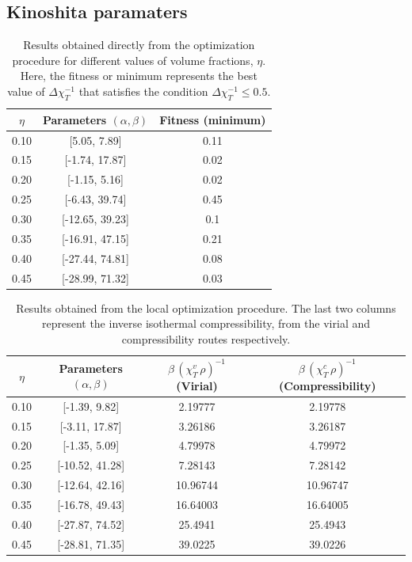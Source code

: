 \subsection{Kinoshita paramaters}
\begin{table}
    \centering
    \begin{tabular}{|c|c|c|}
    \hline
    \(\eta\)  & Parameters \(\left(\alpha, \beta\right)\)  & Fitness (minimum)    \\ \hline
    0.10 & {[}5.05, 7.89{]}    & 0.11          \\ \hline
    0.15 & {[}-1.74, 17.87{]}   & 0.02          \\ \hline
    0.20 & {[}-1.15, 5.16{]}    & 0.02   \\ \hline
    0.25 & {[}-6.43, 39.74{]}   & 0.45  \\ \hline
    0.30 & {[}-12.65, 39.23{]} & 0.1  \\ \hline
    0.35 & {[}-16.91, 47.15{]}    & 0.21  \\ \hline
    0.40 & {[}-27.44, 74.81{]}  & 0.08  \\ \hline
    0.45 & {[}-28.99, 71.32{]}  & 0.03 \\ \hline
    \end{tabular}%
    \caption{Results obtained directly from the optimization procedure for different values of volume fractions, \(\eta\). Here, the fitness or minimum represents the best value of \(\Delta \chi^{-1}_{T}\) that satisfies the condition \(\Delta \chi^{-1}_{T} \leq 0.5\).}
    \label{tab:global-opt}
\end{table}

\begin{table}
    \centering
    \begin{tabular}{|c|c|c|c|}
    \hline
    \(\eta\)  & Parameters \(\left(\alpha, \beta\right)\) & \(\beta \, {\left(\chi^{v}_{T} \, \rho\right)}^{-1}\) (Virial)  & \(\beta \, {\left(\chi^{c}_{T} \, \rho\right)}^{-1}\) (Compressibility)  \\ \hline
    0.10 & [-1.39, 9.82]   & 2.19777  & 2.19778 \\ \hline
    0.15 & [-3.11, 17.87]  & 3.26186 & 3.26187  \\ \hline
    0.20 & [-1.35, 5.09]   & 4.79978  & 4.79972  \\ \hline
    0.25 & [-10.52, 41.28] & 7.28143  & 7.28142 \\ \hline
    0.30 & [-12.64, 42.16] & 10.96744 & 10.96747 \\ \hline
    0.35 & [-16.78, 49.43] & 16.64003 & 16.64005 \\ \hline
    0.40 & [-27.87, 74.52] & 25.4941 & 25.4943 \\ \hline
    0.45 & [-28.81, 71.35] & 39.0225  & 39.0226  \\ \hline
    \end{tabular}
    \caption{Results obtained from the local optimization procedure. The last two columns represent the inverse isothermal compressibility, from the virial and compressibility routes respectively.}
    \label{tab:local-opt}
\end{table}

